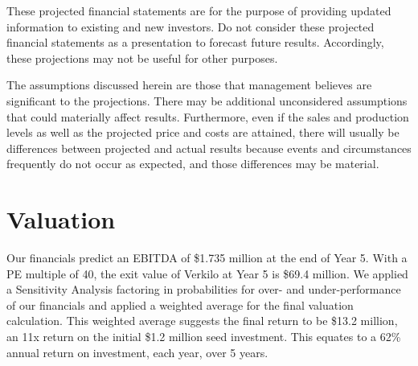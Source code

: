 \documentclass[11pt,openany]{book}
\begin{document}
These projected financial statements are for the purpose of providing
updated information to existing and new investors. Do not consider these
projected financial statements as a presentation to forecast future
results. Accordingly, these projections may not be useful for other
purposes.

The assumptions discussed herein are those that management believes are
significant to the projections. There may be additional unconsidered
assumptions that could materially affect results. Furthermore, even if
the sales and production levels as well as the projected price and costs
are attained, there will usually be differences between projected and
actual results because events and circumstances frequently do not occur
as expected, and those differences may be material.

\hypertarget{valuation}{%
\section{Valuation}\label{valuation}}

Our financials predict an EBITDA of \$1.735 million at the end of Year
5. With a PE multiple of 40, the exit value of Verkilo at Year 5 is
\$69.4 million. We applied a Sensitivity Analysis factoring in
probabilities for over- and under-performance of our financials and
applied a weighted average for the final valuation calculation. This
weighted average suggests the final return to be \$13.2 million, an 11x
return on the initial \$1.2 million seed investment. This equates to a
62\% annual return on investment, each year, over 5 years.
\end{document}
